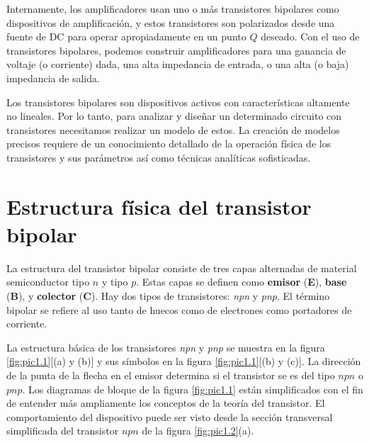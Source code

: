 \documentclass[12pt,a4paper]{book}
\begin{document}
	Internamente, los amplificadores usan uno o más transistores bipolares como dispositivos de amplificación, y estos transistores son polarizados desde una fuente de DC para operar apropiadamente en un punto $Q$ deseado. Con el uso de transistores bipolares, podemos construir amplificadores para una ganancia de voltaje (o corriente) dada, una alta impedancia de entrada, o una alta (o baja) impedancia de salida.
	
	 Los transistores bipolares son dispositivos activos con características altamente no lineales. Por lo tanto, para analizar y diseñar un determinado circuito con transistores necesitamos realizar un  modelo de estos. La creación de modelos precisos requiere de un conocimiento detallado de la operación física de los transistores y sus parámetros así como técnicas analíticas sofisticadas.
	 
	 \section{Estructura física del transistor bipolar}
	 La estructura del transistor bipolar consiste de tres capas alternadas de material semiconductor tipo $n$ y tipo $p$. Estas capas se definen como \textbf{emisor} (\textbf{E}), \textbf{base} (\textbf{B}), y \textbf{colector} (\textbf{C}). Hay dos tipos de transistores: \textit{npn} y \textit{pnp}. El término bipolar se refiere al uso tanto de huecos como de electrones como portadores de corriente.
	 
	 La estructura básica de los transistores \textit{npn} y \textit{pnp} se muestra en la figura \ref{fig:pic1.1}[(a) y (b)] y sus símbolos en la figura \ref{fig:pic1.1}[(b) y (c)]. La dirección de la punta de la flecha en el emisor determina si el transistor se es del tipo $npn$ o $pnp$. Los diagramas de bloque de la figura \ref{fig:pic1.1} están simplificados con el fin de entender más ampliamente los conceptos de la teoría del transistor.
	 El comportamiento del dispositivo puede ser visto desde la sección transversal simplificada del transistor $npn$ de la figura \ref{fig:pic1.2}(a).
	 	 
\end{document}
